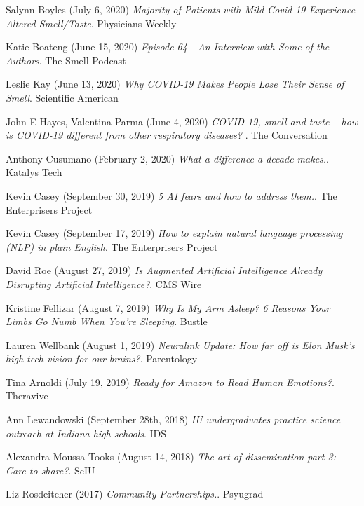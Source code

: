 \documentclass[10pt]{cooperCV2}
\begin{document}
\begin{etaremune}[itemindent=-1.5\bibhang, topsep=0pt,
				   itemsep=\bibsep,partopsep=0pt,parsep=0pt,leftmargin={\bibhang+\widthof{[999]}}]
	
    \item Salynn Boyles (July 6, 2020) \textit{Majority of Patients with Mild Covid-19 Experience Altered Smell/Taste}. Physicians Weekly
     
	
    \item Katie Boateng (June 15, 2020) \textit{Episode 64 - An Interview with Some of the Authors}. The Smell Podcast
     
	
    \item Leslie Kay (June 13, 2020) \textit{Why COVID-19 Makes People Lose Their Sense of Smell}. Scientific American
     
	
    \item John E Hayes, Valentina Parma (June 4, 2020) \textit{COVID-19, smell and taste – how is COVID-19 different from other respiratory diseases? }. The Conversation
     
	
    \item Anthony Cusumano (February 2, 2020) \textit{What a difference a decade makes.}. Katalys Tech
     
	
    \item Kevin Casey (September 30, 2019) \textit{5 AI fears and how to address them.}. The Enterprisers Project
     
	
    \item Kevin Casey (September 17, 2019) \textit{How to explain natural language processing (NLP) in plain English}. The Enterprisers Project
     
	
    \item David Roe (August 27, 2019) \textit{Is Augmented Artificial Intelligence Already Disrupting Artificial Intelligence?}. CMS Wire
     
	
    \item Kristine Fellizar (August 7, 2019) \textit{Why Is My Arm Asleep? 6 Reasons Your Limbs Go Numb When You're Sleeping}. Bustle
     
	
    \item Lauren Wellbank (August 1, 2019) \textit{Neuralink Update: How far off is Elon Musk’s high tech vision for our brains?}. Parentology
     
	
    \item Tina Arnoldi (July 19, 2019) \textit{Ready for Amazon to Read Human Emotions?}. Theravive
     
	
    \item Ann Lewandowski (September 28th, 2018) \textit{IU undergraduates practice science outreach at Indiana high schools}. IDS
     
	
    \item Alexandra Moussa-Tooks (August 14, 2018) \textit{The art of dissemination part 3: Care to share?}. ScIU
     
	
    \item Liz Rosdeitcher (2017) \textit{Community Partnerships.}. Psyugrad
     
	


\end{etaremune}
\end{document}

